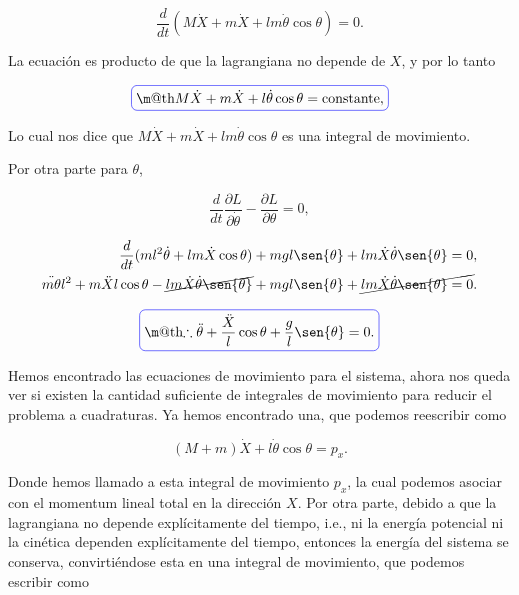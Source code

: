 \documentclass[a4paper,10pt]{article}
\makeatletter
\numberwithin{equation}{section}
\newcommand*{\boxcolor}{blue}
\renewcommand{\boxed}[1]{\textcolor{\boxcolor}{%
\tikz[baseline={([yshift=-1ex]current bounding box.center)}] \node [rectangle, minimum width=1ex,rounded corners,draw] {\normalcolor\m@th$\displaystyle#1$};}}
\makeatother
\begin{document}
\begin{equation}
 \frac{d}{dt} (M \dot{X} + m \dot{X} + lm\dot{\theta}\cos{\theta}) = 0.
 \label{eq:pendu7}
\end{equation}

La ecuación  es producto de que la lagrangiana no depende de $X$, y por 
lo tanto

\begin{equation}
 \boxed{M \dot{X} + m \dot{X} + l\dot{\theta}\cos{\theta} = \text{constante},}
\end{equation}

Lo cual nos dice que $M \dot{X} + m \dot{X} + lm\dot{\theta}\cos{\theta}$ es una integral 
de movimiento.

\vspace{.3cm}

Por otra parte para $\theta$,

\begin{equation}
  \frac{d}{dt}\frac{\partial L}{\partial \dot{\theta}} - \frac{\partial L}{\partial \theta} = 0,
\end{equation}

\begin{align}
\begin{split}
 \frac{d}{dt}(ml^2 \dot{\theta} + lm \dot{X} \cos{\theta}) + mgl\sen{\theta} +
 lm \dot{X} \dot{\theta} \sen{\theta} = 0, \\
 \ddot{m\theta}l^2  + m\ddot{X}l\cos{\theta} - \cancel{lm\dot{X}\dot{\theta}\sen{\theta}} + mgl\sen{\theta} +
 \cancel{lm \dot{X} \dot{\theta} \sen{\theta} = 0}. \\
 \end{split}
\end{align}

\begin{equation}
 \boxed{\therefore \ddot{\theta}  + \frac{\ddot{X}}{l}\cos{\theta} + \frac{g}{l}\sen{\theta} = 0.}
\label{eq:pendudiferential1}
 \end{equation}

Hemos encontrado las ecuaciones de movimiento para el sistema, ahora nos queda ver 
si existen la cantidad suficiente de integrales de movimiento para reducir el problema 
a cuadraturas. Ya hemos encontrado una, que podemos reescribir como

\begin{equation}
 (M + m)\dot{X} + l\dot{\theta} \cos{\theta} = p_x.
 \label{eq:pendu8}
\end{equation}

Donde hemos llamado a esta integral de movimiento $p_x$, la cual podemos asociar con el 
momentum lineal total en la dirección $X$. Por otra parte, debido a que la lagrangiana 
no depende explícitamente del tiempo, i.e., ni la energía potencial ni la cinética dependen 
explícitamente del tiempo, entonces la energía del sistema se conserva, convirtiéndose 
esta en una integral de movimiento, que podemos escribir como
\end{document}
